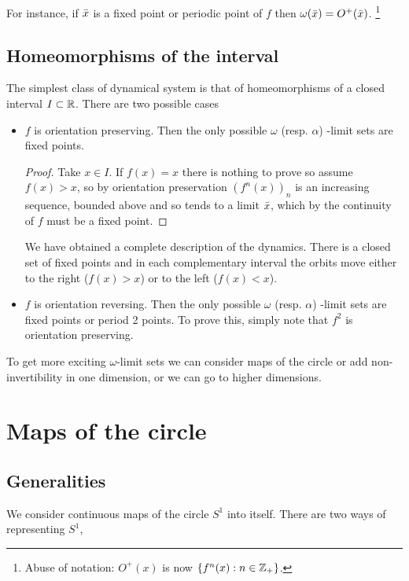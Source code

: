 \documentclass{notes}
\theoremstyle{plain}
\begin{document}
For instance, if $\Bar{x}$ is a fixed point or periodic point of $f$ then
$\omega(\Bar{x}) = O^+(\Bar{x})$.%
\footnote{Abuse of notation: $O^+(x)$ is now $\{ f^n(x) : n \in \mathbb{Z}_+ \}$.}

\section{Homeomorphisms of the interval}\label{sec:inthom}

The simplest class of dynamical system is that of homeomorphisms of
a closed interval $I \subset \mathbb{R}$.  There are two possible cases

\begin{itemize}
\item $f$ is orientation preserving.  Then the only possible $\omega$
(resp. $\alpha$) -limit sets are fixed points.

\begin{proof}
  Take $x \in I$.  If $f(x) = x$ there is nothing to prove so assume
  $f(x) > x$, so by orientation preservation $\left(f^n(x)\right)_n$
  is an increasing sequence, bounded above and so tends to a limit
  $\Bar{x}$, which by the continuity of $f$ must be a fixed point.
\end{proof}

We have obtained a complete description of the dynamics.  There is
a closed set of fixed points and in each complementary interval the
orbits move either to the right ($f(x) > x$) or to the left ($f(x) < x$).

\item $f$ is orientation reversing.  Then the only possible
$\omega$ (resp. $\alpha$) -limit sets are fixed points or period 2 points.
To prove this, simply note that $f^2$ is orientation preserving.
\end{itemize}

To get more exciting $\omega$-limit sets we can consider maps of the
circle or add non-invertibility in one dimension, or we can go to
higher dimensions.

\chapter{Maps of the circle}

\section{Generalities}

We consider continuous maps of the circle $S^1$ into itself.  There
are two ways of representing $S^1$,
\end{document}
